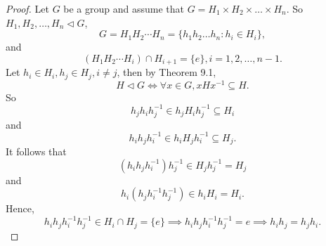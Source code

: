 \documentclass{article}
\theoremstyle{definition}
\begin{document}
        \begin{proof}
           Let $G$ be a group and assume that $G = H_1 \times H_2 \times \dots \times H_n$. So $H_1,H_2,\dots,H_n \lhd G$,
           \begin{equation*}
                G = H_1 H_2 \cdots H_n = \{h_1h_2 \dots h_n: h_i \in H_i\},
            \end{equation*}
            and
            \begin{equation*}
                (H_1H_2 \cdots H_i) \cap H_{i+1} = \{e\}, i=1,2,\dots,n-1.
            \end{equation*}
           Let $h_i \in H_i, h_j \in H_j, i \neq j$, then by Theorem 9.1,
           \begin{equation*}
               H \lhd G \iff \forall x \in G, xHx^{-1} \subseteq H.
           \end{equation*}
           So
           \begin{equation*}
               h_jh_ih_j^{-1} \in h_jH_ih_j^{-1} \subseteq H_i
           \end{equation*}
           and
           \begin{equation*}
               h_ih_jh_i^{-1} \in h_iH_jh_i^{-1} \subseteq H_j.
           \end{equation*}
           It follows that
           \begin{equation*}
               (h_ih_jh_i^{-1})h_j^{-1} \in H_jh_j^{-1} = H_j
           \end{equation*}
           and
           \begin{equation*}
               h_i(h_jh_i^{-1}h_j^{-1}) \in h_iH_i = H_i.
           \end{equation*}
           Hence,
           \begin{equation*}
               h_ih_jh_i^{-1}h_j^{-1} \in H_i \cap H_j = \{e\} \implies h_ih_jh_i^{-1}h_j^{-1} = e \implies h_ih_j=h_jh_i.
           \end{equation*}
           

\end{proof}
\end{document}
